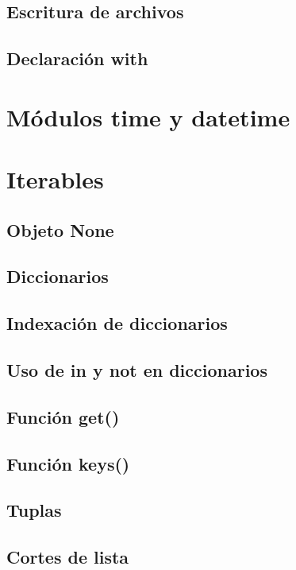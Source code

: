 \documentclass{article}
\begin{document}
\subsection{Escritura de archivos}

\subsection{Declaración with}

\section{Módulos time y datetime}

\section{Iterables}

\subsection{Objeto None}

\subsection{Diccionarios}

\subsection{Indexación de diccionarios}

\subsection{Uso de in y not en diccionarios}

\subsection{Función get()}

\subsection{Función keys()}

\subsection{Tuplas}

\subsection{Cortes de lista}
\end{document}
